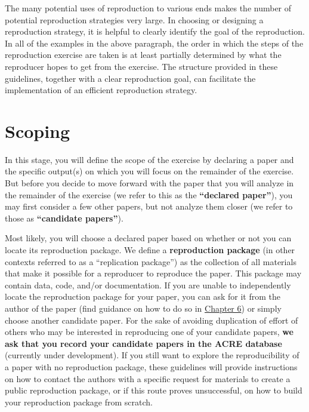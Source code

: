 \documentclass[]{book}
\begin{document}
The many potential uses of reproduction to various ends makes the number of potential reproduction strategies very large. In choosing or designing a reproduction strategy, it is helpful to clearly identify the goal of the reproduction. In all of the examples in the above paragraph, the order in which the steps of the reproduction exercise are taken is at least partially determined by what the reproducer hopes to get from the exercise. The structure provided in these guidelines, together with a clear reproduction goal, can facilitate the implementation of an efficient reproduction strategy.

\hypertarget{scoping}{%
\chapter{Scoping}\label{scoping}}

In this stage, you will define the scope of the exercise by declaring a paper and the specific output(s) on which you will focus on the remainder of the exercise. But before you decide to move forward with the paper that you will analyze in the remainder of the exercise (we refer to this as the \textbf{``declared paper''}), you may first consider a few other papers, but not analyze them closer (we refer to those as \textbf{``candidate papers''}).

Most likely, you will choose a declared paper based on whether or not you can locate its reproduction package. We define a \textbf{reproduction package} (in other contexts referred to as a ``replication package'') as the collection of all materials that make it possible for a reproducer to reproduce the paper. This package may contain data, code, and/or documentation. If you are unable to independently locate the reproduction package for your paper, you can ask for it from the author of the paper (find guidance on how to do so in \href{https://bitss.github.io/ACRE/guidance-for-a-constructive-exchange-between-reproducers-and-original-authors.html}{Chapter 6}) or simply choose another candidate paper. For the sake of avoiding duplication of effort of others who may be interested in reproducing one of your candidate papers, \textbf{we ask that you record your candidate papers in the ACRE database} (currently under development). If you still want to explore the reproducibility of a paper with no reproduction package, these guidelines will provide instructions on how to contact the authors with a specific request for materials to create a public reproduction package, or if this route proves unsuccessful, on how to build your reproduction package from scratch.
\end{document}

